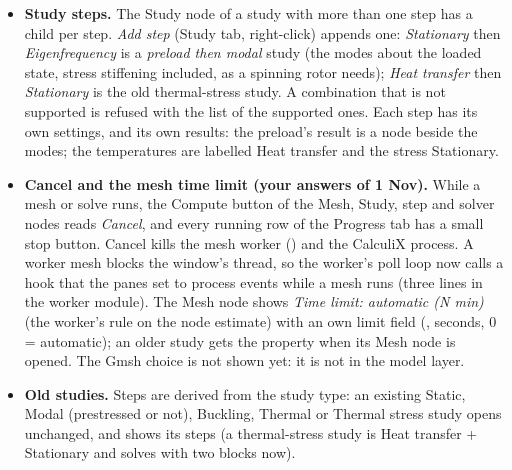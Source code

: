 \begin{itemize}[nosep]
        out of date when that selection changes.
  \item \textbf{Study steps.} The Study node of a study with more than one step has a child per step. \emph{Add step} (Study
        tab, right-click) appends one: \emph{Stationary} then \emph{Eigenfrequency} is a \emph{preload then modal} study (the
        modes about the loaded state, stress stiffening included, as a spinning rotor needs); \emph{Heat transfer} then
        \emph{Stationary} is the old thermal-stress study. A combination that is not supported is refused with the list of the
        supported ones. Each step has its own settings, and its own results: the preload's result is a node beside the modes;
        the temperatures are labelled Heat transfer and the stress Stationary.
  \item \textbf{Cancel and the mesh time limit (your answers of 1 Nov).} While a mesh or solve runs, the Compute button of the
        Mesh, Study, step and solver nodes reads \emph{Cancel}, and every running row of the Progress tab has a small stop button.
        Cancel kills the mesh worker () and the CalculiX process. A worker mesh blocks
        the window's thread, so the worker's poll loop now calls a  hook that the panes set to process events while
        a mesh runs (three lines in the worker module). The Mesh node shows \emph{Time limit: automatic (N min)} (the worker's
        rule on the node estimate) with an own limit field (, seconds, 0 = automatic); an older study gets
        the property when its Mesh node is opened. The Gmsh choice is not shown yet: it is not in the model layer.
  \item \textbf{Old studies.} Steps are derived from the study type: an existing Static, Modal (prestressed or not), Buckling,
        Thermal or Thermal stress study opens unchanged, and shows its steps (a thermal-stress study is Heat transfer + Stationary
        and solves with two  blocks now).
\end{itemize}

